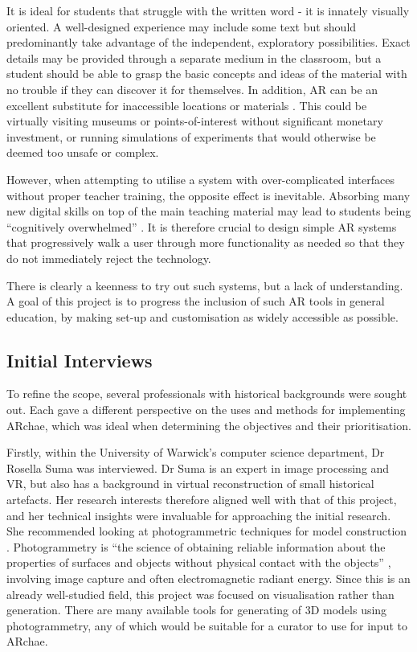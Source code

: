 \documentclass[12pt, a4paper]{article}
\begin{document}
It is ideal for students that struggle with the written word \cite{education:class} - it is innately visually oriented. A well-designed experience may include some text but should predominantly take advantage of the independent, exploratory possibilities. Exact details may be provided through a separate medium in the classroom, but a student should be able to grasp the basic concepts and ideas of the material with no trouble if they can discover it for themselves. In addition, AR can be an excellent substitute for inaccessible locations or materials \cite{education:placespotentials}. This could be virtually visiting museums or points-of-interest without significant monetary investment, or running simulations of experiments that would otherwise be deemed too unsafe or complex.

However, when attempting to utilise a system with over-complicated interfaces without proper teacher training, the opposite effect is inevitable. Absorbing many new digital skills on top of the main teaching material may lead to students being “cognitively overwhelmed” \cite{education:overwhelm}. It is therefore crucial to design simple AR systems that progressively walk a user through more functionality as needed so that they do not immediately reject the technology. 

There is clearly a keenness to try out such systems, but a lack of understanding. A goal of this project is to progress the inclusion of such AR tools in general education, by making set-up and customisation as widely accessible as possible. 

\subsection{Initial Interviews}
To refine the scope, several professionals with historical backgrounds were sought out. Each gave a different perspective on the uses and methods for implementing ARchae, which was ideal when determining the objectives and their prioritisation.

Firstly, within the University of Warwick's computer science department, Dr Rosella Suma was interviewed. Dr Suma is an expert in image processing and VR, but also has a background in virtual reconstruction of small historical artefacts. Her research interests therefore aligned well with that of this project, and her technical insights were invaluable for approaching the initial research. She recommended looking at photogrammetric techniques for model construction \cite{interviews:rosellapaper}. Photogrammetry is ``the science of obtaining reliable information about the
properties of surfaces and objects without physical contact with the objects'' \cite{interviews:photogrammetry}, involving image capture and often electromagnetic radiant energy. Since this is an already well-studied field, this project was focused on visualisation rather than generation. There are many available tools for generating of 3D models using photogrammetry, any of which would be suitable for a curator to use for input to ARchae.
\end{document}
